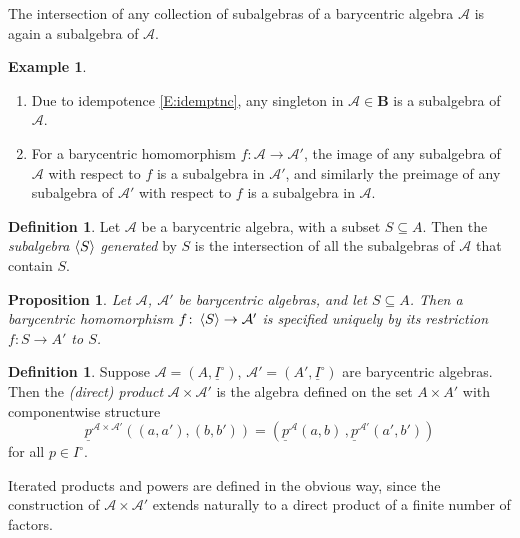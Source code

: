 \documentclass[12pt]{amsart}
\theoremstyle{plain}
\newtheorem{proposition}[theorem]{Proposition}
\theoremstyle{definition}
\newtheorem{definition}[theorem]{Definition}
\newtheorem{example}[theorem]{Example}
\numberwithin{equation}{section}
\begin{document}
The intersection of any collection of subalgebras of a barycentric algebra $\mathcal{A}$ is again a subalgebra of $\mathcal{A}$.

\begin{example}
\begin{enumerate}
\item[$(\mathrm a)$] Due to idempotence \eqref{E:idemptnc}, any singleton in $\mathcal{A}\in\mathbf{B}$ is a subalgebra of $\mathcal{A}$.
\item[$(\mathrm b)$] For a barycentric homomorphism $f\colon \mathcal{A}\to\mathcal{A}'$, the image of any subalgebra of $\mathcal{A}$ with respect to $f$ is a subalgebra in $\mathcal{A}'$, and similarly the preimage of any subalgebra of $\mathcal{A}'$ with respect to $f$ is a subalgebra in $\mathcal{A}$.
\end{enumerate}
\end{example}

\begin{definition}\label{D:Sbgen}
Let $\mathcal{A}$ be a barycentric algebra, with a subset $S\subseteq A$. Then the \emph{subalgebra} $\braket S$ \emph{generated} by $S$ is the intersection of all the subalgebras of $\mathcal{A}$ that contain $S$.
\end{definition}

\begin{proposition}\cite[Proposition 123]{RS85}\label{P:hs}
Let $\mathcal{A}$, $\mathcal{A}'$ be barycentric algebras, and let $S\subseteq A$. Then a barycentric homomorphism $f\colon \braket S\to \mathcal{A}'$ is specified uniquely by its restriction $f\colon S\to A'$ to $S$.
\end{proposition}

\begin{definition}\label{D:DiPr}
Suppose $\mathcal{A}=(A,\underline{I}^{\circ})$, $\mathcal{A}'=(A',\underline{I}^{\circ})$ are barycentric algebras. Then the \emph{(direct) product} $\mathcal{A}\times\mathcal{A}'$ is the algebra defined on the set $A\times A'$ with componentwise structure
\begin{equation*}
\underline p^{\mathcal{A}\times\mathcal{A}'}((a,a'),(b,b'))=\left(\underline p^\mathcal{A}(a,b)\,,\underline p^{\mathcal{A}'}(a',b')\right)
\end{equation*}
for all $p\in I^\circ$.
\end{definition}


Iterated products and powers are defined in the obvious way, since the construction of $\mathcal{A}\times\mathcal{A}'$ extends naturally to a direct product of a finite number of factors.
\end{document}
